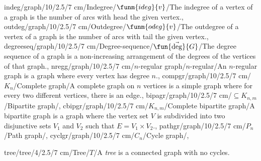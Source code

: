 indeg/graph/10/2.5/7 cm/{Indegree}/{$\funm{ideg}{v}$}/{The indegree of a vertex of a graph is the number of arcs with head the given vertex.},
outdeg/graph/10/2.5/7 cm/{Outdegree}/{$\funm{odeg}{v}$}/{The outdegree of a vertex of a graph is the number of arcs with tail the given vertex.},
degreeseq/graph/10/2.5/7 cm/{Degree-sequence}/{$\fun{\vec{\mbox{deg}}}{G}$}/{The degree sequence of a graph is a non-increasing arrangement of the degrees of the vertices of that graph.},
nregg/graph/10/2.5/7 cm/{$n$-regular graph}/{$n$-regular}/{An $n$-regular graph is a graph where every vertex has degree $n$.},
compgr/graph/10/2.5/7 cm/{$K_n$}/{Complete graph}/{A complete graph on $n$ vertices is a simple graph where for every two different vertices, there is an edge.},
bipagr/graph/10/2.5/7 cm/{$\subseteq K_{n,m}$}/{Bipartite graph}/{},
cbipgr/graph/10/2.5/7 cm/{$K_{n,m}$}/{Complete bipartite graph}/{A bipartite graph is a graph where the vertex set $V$ is subdivided into two disjunctive sets $V_1$ and $V_2$ such that $E=V_1\times V_2$.},
pathgr/graph/10/2.5/7 cm/{$P_n$}/{Path graph}/{},
cyclgr/graph/10/2.5/7 cm/{$C_n$}/{Cycle graph}/{},

tree/tree/4/2.5/7 cm/Tree/$T$/{A \emph{tree} is a connected graph with no cycles.}
